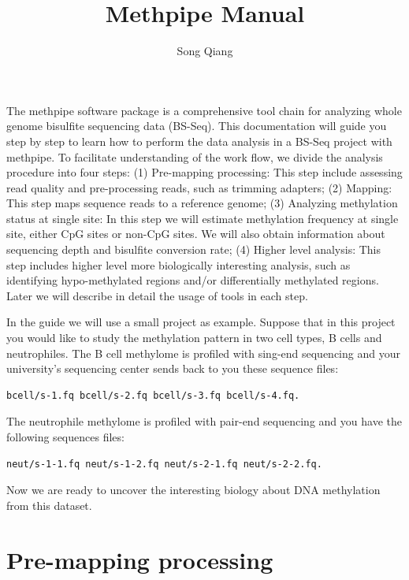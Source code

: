 \documentclass{article}
\title{Methpipe Manual}
\author{Song Qiang}
\begin{document}
\maketitle
The methpipe software package is a comprehensive tool chain for
analyzing whole genome bisulfite sequencing data (BS-Seq).  This
documentation will guide you step by step to learn how to perform the
data analysis in a BS-Seq project with methpipe. To facilitate
understanding of the work flow, we divide the analysis procedure into
four steps: (1) Pre-mapping processing: This step include assessing
read quality and pre-processing reads, such as trimming adapters; (2)
Mapping: This step maps sequence reads to a reference genome; (3)
Analyzing methylation status at single site: In this step we will
estimate methylation frequency at single site, either CpG sites or
non-CpG sites. We will also obtain information about sequencing depth
and bisulfite conversion rate; (4) Higher level analysis: This step
includes higher level more biologically interesting analysis, such as
identifying hypo-methylated regions and/or differentially methylated
regions. Later we will describe in detail the usage of tools in each
step.

In the guide we will use a small project as example. Suppose that in
this project you would like to study the methylation pattern in two
cell types, B cells and neutrophiles. The B cell methylome is profiled
with sing-end sequencing and your university's sequencing center sends
back to you these sequence files:
\begin{verbatim}
bcell/s-1.fq bcell/s-2.fq bcell/s-3.fq bcell/s-4.fq.
\end{verbatim}
The neutrophile methylome is profiled with pair-end sequencing and you
have the following sequences files:
\begin{verbatim}
neut/s-1-1.fq neut/s-1-2.fq neut/s-2-1.fq neut/s-2-2.fq.
\end{verbatim}
Now we are ready to uncover the interesting biology about DNA
methylation from this dataset. 

\section{Pre-mapping processing}
\label{sec:premapping}
\end{document}
